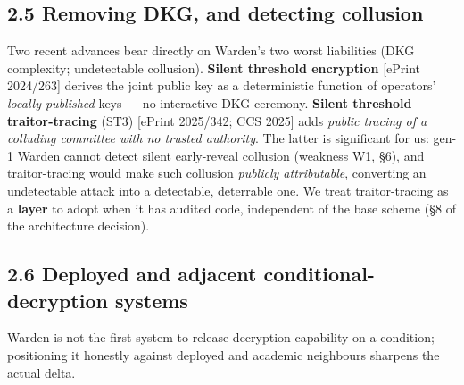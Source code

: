 \documentclass[
  11pt,
]{article}
\begin{document}
\subsection{2.5 Removing DKG, and detecting
collusion}\label{removing-dkg-and-detecting-collusion}

Two recent advances bear directly on Warden's two worst liabilities (DKG
complexity; undetectable collusion). \textbf{Silent threshold
encryption} {[}ePrint 2024/263{]} derives the joint public key as a
deterministic function of operators' \emph{locally published} keys ---
no interactive DKG ceremony. \textbf{Silent threshold traitor-tracing}
(ST3) {[}ePrint 2025/342; CCS 2025{]} adds \emph{public tracing of a
colluding committee with no trusted authority}. The latter is
significant for us: gen-1 Warden cannot detect silent early-reveal
collusion (weakness W1, §6), and traitor-tracing would make such
collusion \emph{publicly attributable}, converting an undetectable
attack into a detectable, deterrable one. We treat traitor-tracing as a
\textbf{layer} to adopt when it has audited code, independent of the
base scheme (§8 of the architecture decision).

\subsection{2.6 Deployed and adjacent conditional-decryption
systems}\label{deployed-and-adjacent-conditional-decryption-systems}

Warden is not the first system to release decryption capability on a
condition; positioning it honestly against deployed and academic
neighbours sharpens the actual delta.
\end{document}
